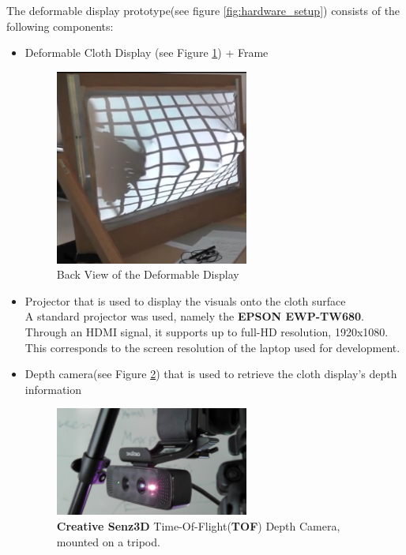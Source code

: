 \documentclass[]{article}
\begin{document}
The deformable display prototype(see figure \ref{fig:hardware_setup}) consists of the following components:
\begin{itemize}
\item Deformable Cloth Display (see Figure \ref{fig:BackViewDeformableDisplay}) + Frame
\begin{figure}[hbtp]
    \centering
    \includegraphics[width=0.6\textwidth]{figures/DisplayBackView.png}
    \caption{Back View of the Deformable Display}
    \label{fig:BackViewDeformableDisplay}
\end{figure}
\item Projector that is used to display the visuals onto the cloth surface\\

A standard projector was used, namely the \textbf{EPSON EWP-TW680}. Through an HDMI signal, it supports up to full-HD resolution, 1920x1080. This corresponds to the screen resolution of the laptop used for development.
\item Depth camera(see Figure \ref{fig:CreativeSenz3D}) that is used to retrieve the cloth display’s depth information\\

\begin{figure}[hbtp]
    \centering
    \includegraphics[width=0.6\textwidth]{figures/CreativeDepthCam.JPG}
    \caption{\textbf{Creative Senz3D} Time-Of-Flight(\textbf{TOF}) Depth Camera, mounted on a tripod.}
    \label{fig:CreativeSenz3D}
\end{figure}


\end{itemize}
\end{document}
